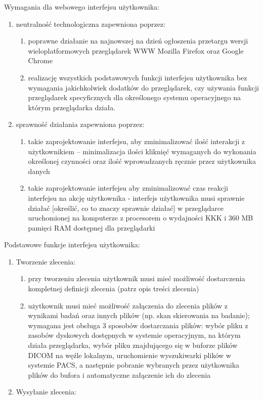 \documentclass[a4paper]{article}
\begin{document}
Wymagania dla webowego interfejsu użytkownika:

\begin{enumerate}
    \item neutralność technologiczna zapewniona poprzez:
	  \begin{enumerate}
	  \item poprawne działanie na najnowszej na dzień ogłoszenia przetargu wersji wieloplatformowych przeglądarek WWW Mozilla Firefox oraz Google Chrome
	  \item realizację wszystkich podstawowych funkcji interfejsu użytkownika bez wymagania jakichkolwiek dodatków do przeglądarek, czy używania funkcji przeglądarek specyficznych dla określonego systemu operacyjnego na którym przeglądarka działa.
	  \end{enumerate}
    \item sprawność działania zapewniona poprzez:
	  \begin{enumerate}
	  \item takie zaprojektowanie interfejsu, aby zminimalizować ilość interakcji z użytkownikiem -- minimalizacja ilości kliknięć wymaganych do wykonania określonej czynności oraz ilość wprowadzanych ręcznie przez użytkownika danych
	  \item takie zaprojektowanie interfejsu aby zminimalizować czas reakcji interfejsu na akcję użytkownika - interfejs użytkownika musi sprawnie działać [określić, co to znaczy sprawnie działać] w przeglądarce uruchomionej na komputerze z procesorem o wydajności KKK i 360 MB pamięci RAM dostępnej dla przeglądarki
	  \end{enumerate}
\end{enumerate}

Podstawowe funkcje interfejsu użytkownika:
\begin{enumerate}
  \item Tworzenie zlecenia:
      \begin{enumerate}
      \item przy tworzeniu zlecenia użytkownik musi mieć możliwość dostarczenia kompletnej definicji zlecenia (patrz opis treści zlecenia)
      \item użytkownik musi mieć możliwość załączenia do zlecenia plików z wynikami badań oraz innych plików (np. skan  skierowania na badanie); wymagana jest obsługa 3 sposobów dostarczania plików: wybór pliku z zasobów dyskowych dostępnych w systemie operacyjnym, na którym działa przeglądarka, wybór pliku znajdującego się w buforze plików DICOM na węźle lokalnym, uruchomienie wyszukiwarki plików w systemie PACS, a następnie pobranie wybranych przez użytkownika plików do bufora i automatyczne załączenie ich do zlecenia
      \end{enumerate}
  \item Wysyłanie zlecenia:
\end{enumerate}
\end{document}
